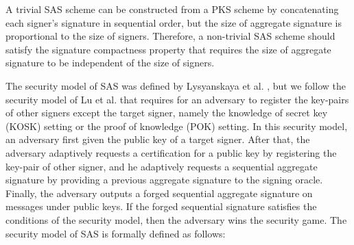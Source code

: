 \documentclass[11pt,letterpaper]{article}
\begin{document}
A trivial SAS scheme can be constructed from a PKS scheme by concatenating
each signer's signature in sequential order, but the size of aggregate
signature is proportional to the size of signers. Therefore, a non-trivial
SAS scheme should satisfy the signature compactness property that requires
the size of aggregate signature to be independent of the size of signers.

The security model of SAS was defined by Lysyanskaya et al.
\cite{LysyanskayaMRS04}, but we follow the security model of Lu et al.
\cite{LuOSSW06} that requires for an adversary to register the key-pairs of
other signers except the target signer, namely the knowledge of secret key
(KOSK) setting or the proof of knowledge (POK) setting. In this security
model, an adversary first given the public key of a target signer. After
that, the adversary adaptively requests a certification for a public key by
registering the key-pair of other signer, and he adaptively requests a
sequential aggregate signature by providing a previous aggregate signature to
the signing oracle. Finally, the adversary outputs a forged sequential
aggregate signature on messages under public keys. If the forged sequential
signature satisfies the conditions of the security model, then the adversary
wins the security game. The security model of SAS is formally defined as
follows:
\end{document}
